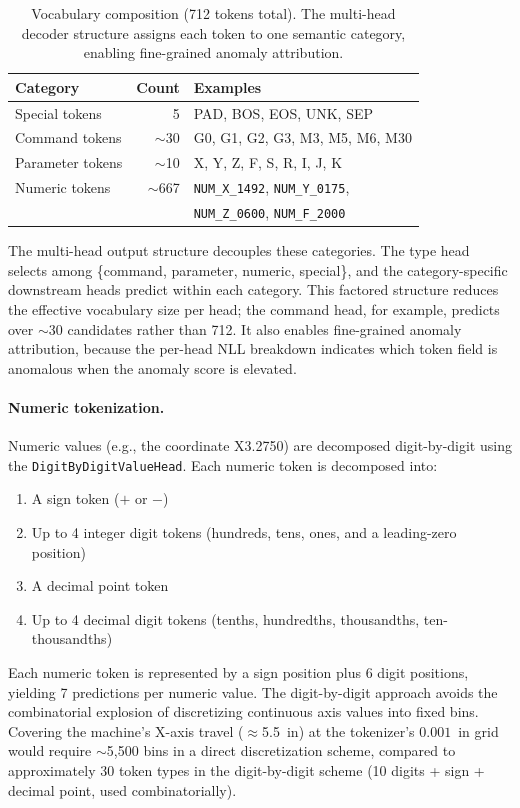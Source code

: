 \begin{table}[ht]
\centering
\caption{Vocabulary composition (712 tokens total). The multi-head decoder structure assigns each token to one semantic category, enabling fine-grained anomaly attribution.}
\label{tab:vocab_structure}
\begin{tabular}{@{}lrl@{}}
\toprule
Category & Count & Examples \\
\midrule
Special tokens & 5 & PAD, BOS, EOS, UNK, SEP \\
Command tokens & $\sim$30 & G0, G1, G2, G3, M3, M5, M6, M30 \\
Parameter tokens & $\sim$10 & X, Y, Z, F, S, R, I, J, K \\
Numeric tokens & $\sim$667 & \texttt{NUM\_X\_1492}, \texttt{NUM\_Y\_0175}, \\
& & \texttt{NUM\_Z\_0600}, \texttt{NUM\_F\_2000} \\
\bottomrule
\end{tabular}
\end{table}

The multi-head output structure decouples these categories.
The type head selects among \{command, parameter, numeric, special\}, and the category-specific downstream heads predict within each category.
This factored structure reduces the effective vocabulary size per head; the command head, for example, predicts over $\sim$30 candidates rather than 712.
It also enables fine-grained anomaly attribution, because the per-head NLL breakdown indicates which token field is anomalous when the anomaly score is elevated.

\paragraph{Numeric tokenization.}
Numeric values (e.g., the coordinate X3.2750) are decomposed digit-by-digit using the \texttt{DigitByDigitValueHead}.
Each numeric token is decomposed into:
\begin{enumerate}
    \item A sign token ($+$ or $-$)
    \item Up to 4 integer digit tokens (hundreds, tens, ones, and a leading-zero position)
    \item A decimal point token
    \item Up to 4 decimal digit tokens (tenths, hundredths, thousandths, ten-thousandths)
\end{enumerate}
Each numeric token is represented by a sign position plus 6 digit positions, yielding 7 predictions per numeric value.
The digit-by-digit approach avoids the combinatorial explosion of discretizing continuous axis values into fixed bins.
Covering the machine's X-axis travel ($\approx$5.5~in) at the tokenizer's $0.001$~in grid would require $\sim$5{,}500 bins in a direct discretization scheme, compared to approximately 30 token types in the digit-by-digit scheme (10 digits + sign + decimal point, used combinatorially).

